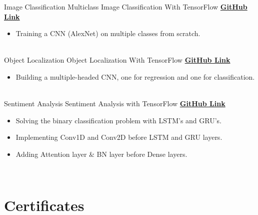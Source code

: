 \documentclass[letterpaper]{DS_class_file} %
\begin{document}
\begin{twenty}
	\twentyitem
	{Image}
	{Classification}
	{\hspace{0.3cm}Multiclass Image Classification With TensorFlow}
	{\href{https://github.com/MuhammedBuyukkinaci/TensorFlow-Multiclass-Image-Classification-using-CNN-s}{\textbf{GitHub Link}}}
	{}
	{
		{\begin{itemize}
				\item Training a CNN (AlexNet) on multiple classes from scratch.
		\end{itemize}}
	}
	\\
	\twentyitem
	{Object}
	{Localization}
	{\hspace{0.3cm}Object Localization With TensorFlow}
	{\href{https://github.com/MuhammedBuyukkinaci/Object-Classification-and-Localization-with-TensorFlow}{\textbf{GitHub Link}}}
	{}
	{
	{\begin{itemize}
			\item Building a multiple-headed CNN, one for regression and one for classification.
	\end{itemize} }
	}
	\\
	\twentyitem
	{Sentiment}
	{Analysis}
	{\hspace{0.3cm}Sentiment Analysis with TensorFlow}
	{\href{https://github.com/MuhammedBuyukkinaci/TensorFlow-Sentiment-Analysis-on-Amazon-Reviews-Data}{\textbf{GitHub Link}}}
	{}
	{
		{\begin{itemize}
				\item Solving the binary classification problem with LSTM's and GRU's.
				\item Implementing Conv1D and Conv2D before LSTM and GRU layers.
				\item Adding Attention layer \& BN layer before Dense layers.
		\end{itemize}}
	}
	\\
	
	
\end{twenty}

\section{Certificates}
\end{document}
